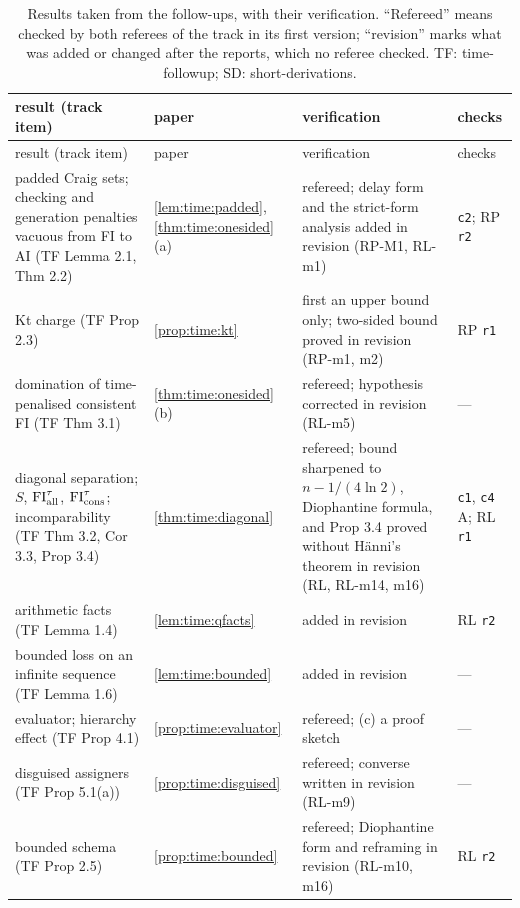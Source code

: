 {\footnotesize
\begin{longtable}{@{}>{\raggedright\arraybackslash}p{3.6cm}>{\raggedright\arraybackslash}p{2.6cm}>{\raggedright\arraybackslash}p{6.0cm}>{\raggedright\arraybackslash}p{2.6cm}@{}}
\caption{Results taken from the follow-ups, with their verification. ``Refereed'' means checked by both referees of the track in its first version; ``revision'' marks what was added or changed after the reports, which no referee checked. TF: time-followup; SD: short-derivations.}\label{tab:ver:followups}\\
\toprule
result (track item) & paper & verification & checks\\
\midrule
\endfirsthead
\toprule
result (track item) & paper & verification & checks\\
\midrule
\endhead
\bottomrule
\endfoot
padded Craig sets; checking and generation penalties vacuous from FI to AI (TF Lemma 2.1, Thm 2.2) & \cref{lem:time:padded}, \cref{thm:time:onesided}(a) & refereed; delay form and the strict-form analysis added in revision (RP-M1, RL-m1) & \texttt{c2}; RP \texttt{r2}\\
Kt charge (TF Prop 2.3) & \cref{prop:time:kt} & first an upper bound only; two-sided bound proved in revision (RP-m1, m2) & RP \texttt{r1}\\
domination of time-penalised consistent FI (TF Thm 3.1) & \cref{thm:time:onesided}(b) & refereed; hypothesis corrected in revision (RL-m5) & ---\\
diagonal separation; $S$, $\mathrm{FI}_{\mathrm{all}}^\tau$, $\mathrm{FI}_{\mathrm{cons}}^\tau$; incomparability (TF Thm 3.2, Cor 3.3, Prop 3.4) & \cref{thm:time:diagonal} & refereed; bound sharpened to $n-1/(4\ln2)$, Diophantine formula, and Prop 3.4 proved without H\"anni's theorem in revision (RL, RL-m14, m16) & \texttt{c1}, \texttt{c4} A; RL \texttt{r1}\\
arithmetic facts (TF Lemma 1.4) & \cref{lem:time:qfacts} & added in revision & RL \texttt{r2}\\
bounded loss on an infinite sequence (TF Lemma 1.6) & \cref{lem:time:bounded} & added in revision & ---\\
evaluator; hierarchy effect (TF Prop 4.1) & \cref{prop:time:evaluator} & refereed; (c) a proof sketch & ---\\
disguised assigners (TF Prop 5.1(a)) & \cref{prop:time:disguised} & refereed; converse written in revision (RL-m9) & ---\\
bounded schema (TF Prop 2.5) & \cref{prop:time:bounded} & refereed; Diophantine form and reframing in revision (RL-m10, m16) & RL \texttt{r2}\\

\end{longtable}}
